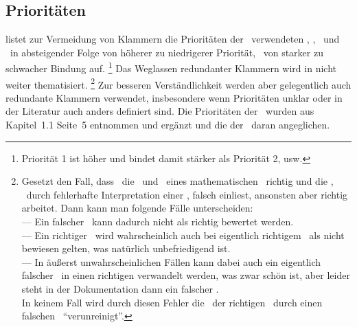 \subsection{Prioritäten}%
\label {sub:Prioritaeten}

 listet zur Vermeidung von Klammern die Prioritäten der \hier\ verwendeten \Operationen, \Relationen, \Junktoren\ und \Metadefinitionen\ in absteigender Folge von höherer zu niedrigerer Priorität, \textdh\ von starker zu schwacher Bindung auf.%
\footnote{Priorität 1 ist höher und bindet damit stärker als Priorität 2, usw.}
Das Weglassen redundanter Klammern wird in  nicht weiter thematisiert.%
\footnote{%
	Gesetzt den Fall, dass \ASBA\ die \Praemissen\ und \Konklusionen\ eines mathematischen \Satzes\ richtig und die \Beweisschritte, \textzB\ durch fehlerhafte Interpretation einer \Formel, falsch einliest, ansonsten aber richtig arbeitet.
	Dann kann man folgende Fälle unterscheiden:\\
	--- Ein falscher \Satz\ kann dadurch nicht als richtig bewertet werden.\\
	--- Ein richtiger \Satz\ wird wahrscheinlich auch bei eigentlich richtigem \Beweis\ als nicht bewiesen gelten, was natürlich unbefriedigend ist.\\
	--- In äußerst unwahrscheinlichen Fällen kann dabei auch ein eigentlich falscher \Beweis\ in einen richtigen verwandelt werden, was zwar schön ist, aber leider steht in der Dokumentation dann ein falscher \Beweis.\\
	In keinem Fall wird durch diesen Fehler die \Menge\ der richtigen \Saetze\ durch einen falschen \Satz\ "`verunreinigt"'.
}
Zur besseren Verständlichkeit werden aber gelegentlich auch redundante Klammern verwendet, insbesondere wenn Prioritäten unklar oder in der Literatur auch anders definiert sind.
Die Prioritäten der \Junktoren\ wurden aus~\cite{bib:Rautenberg} Kapitel~1.1 Seite~5 entnommen und ergänzt und die der \Metaoperationen\ daran angeglichen.

